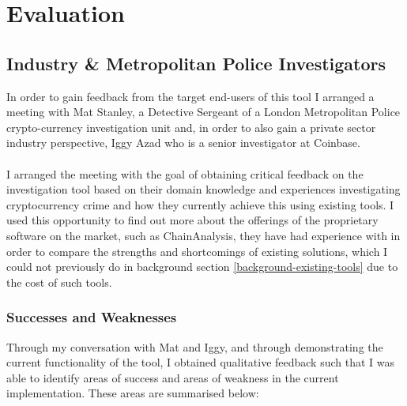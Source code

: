 \chapter{Evaluation}
\section{Industry \& Metropolitan Police Investigators} 
In order to gain feedback from the target end-users of this tool I arranged a meeting with Mat Stanley, a Detective Sergeant of a London Metropolitan Police crypto-currency investigation unit and, in order to also gain a private sector industry perspective, Iggy Azad who is a senior investigator at Coinbase.
\\\\
I arranged the meeting with the goal of obtaining critical feedback on the investigation tool based on their domain knowledge and experiences investigating cryptocurrency crime and how they currently achieve this using existing tools. I used this opportunity to find out more about the offerings of the proprietary software on the market, such as ChainAnalysis, they have had experience with in order to compare the strengths and shortcomings of existing solutions, which I could not previously do in background section \ref{background-existing-tools} due to the cost of such tools. 

\subsection{Successes and Weaknesses}
Through my conversation with Mat and Iggy, and through demonstrating the current functionality of the tool, I obtained qualitative feedback such that I was able to identify areas of success and areas of weakness in the current implementation. These areas are summarised below:

